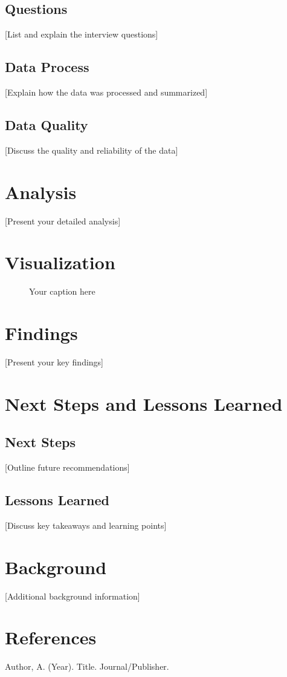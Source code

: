 \documentclass[12pt,a4paper]{article}
\begin{document}
\subsection{Questions}
[List and explain the interview questions]

\subsection{Data Process}
[Explain how the data was processed and summarized]

\subsection{Data Quality}
[Discuss the quality and reliability of the data]

\section{Analysis}
[Present your detailed analysis]

\section{Visualization}
\begin{figure}[H]
    \centering
    \caption{Your caption here}
    \label{fig:your-label}
\end{figure}

\section{Findings}
[Present your key findings]

\section{Next Steps and Lessons Learned}
\subsection{Next Steps}
[Outline future recommendations]

\subsection{Lessons Learned}
[Discuss key takeaways and learning points]

\begin{appendices}
\section{Background}
[Additional background information]

\section{References}
\begin{thebibliography}{9}
     Author, A. (Year). Title. Journal/Publisher.
\end{thebibliography}
\end{appendices}
\end{document}
